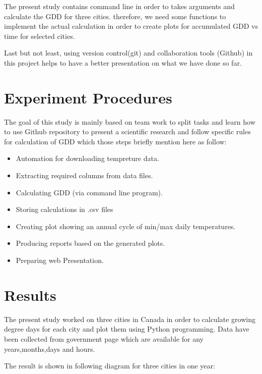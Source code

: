 \documentclass[DIV=calc, paper=a4, fontsize=11pt, twocolumn]{scrartcl}
\begin{document}
The present study contains command line in order to takes arguments and calculate the GDD for three cities. therefore, we need some functions to implement the actual calculation in order to create plots for accumulated GDD vs time for selected cities.

Last but not least, using version control(git) and collaboration tools (Github) in this project helps to have a better presentation on what we have done so far.


\section{Experiment Procedures}
The goal of this study is mainly based on team work to split tasks and learn how to use Github repository to present a scientific research and follow specific rules for calculation of GDD which those steps briefly mention here as follow:

\begin{itemize}
\item Automation for downloading tempreture data.
\item Extracting required columns from data files.
\item Calculating GDD (via command line program).
\item Storing calculations in .csv files
\item Creating plot showing an annual cycle of min/max daily temperatures.
\item Producing reports based on the generated plots.
\item Preparing web Presentation.
\end{itemize}
\section{Results}
The present study worked on three cities in Canada in order to calculate growing degree days for each city and plot them using Python programming. Data have been collected from government page which are available for any years,months,days and hours. 

The result is shown in following diagram for three cities in one year:
\end{document}
